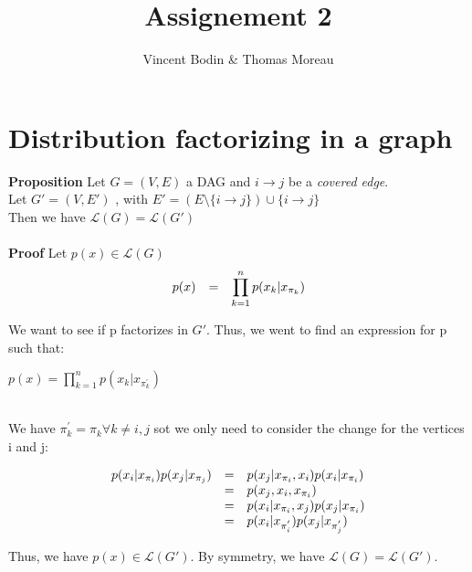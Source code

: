 \documentclass[11pt]{article}
\title{\textbf{Assignement 2}}
\author{Vincent Bodin \& Thomas Moreau}
\date{}
\begin{document}
\maketitle

\section{Distribution factorizing in a graph}

\textbf{Proposition} Let $G = (V, E)$ a DAG and $i \rightarrow j$ be a \textit{covered edge}.\\
Let  $G' = (V, E')$ , with $E' = (E\setminus\{i\rightarrow j\})\cup \{i \rightarrow j\}$\\
Then we have $\mathcal{L}(G) = \mathcal{L}(G')$\\
\\
\textbf{Proof}  Let $p(x) \in \mathcal{L}(G)$\\
\begin{equation*}
\begin{array}{r l l}
p(x) &=& \displaystyle\prod_{k=1}^{n} p(x_k | x_{\pi_k})\\
\end{array}
\end{equation*}

We want to see if p factorizes in $G'$. Thus, we went to find an expression for p such that:\\
\centerline{$p(x) = \displaystyle\prod_{k=1}^{n} p(x_k | x_{\pi_k^{'}})$}
\\
We have $\pi_k^{'} = \pi_k \forall k \neq i,j$ sot we only need to consider the change for the vertices i and j:


\begin{equation*}
\begin{array}{r l l}
p(x_i| x_{\pi_i}) p(x_j | x_{\pi_j}) &=& p(x_j | x_{\pi_i}, x_i) p(x_i | x_{\pi_i})\\
&=& p(x_j, x_i, x_{\pi_i})\\
&=& p(x_i | x_{\pi_i}, x_j) p(x_j | x_{\pi_i})\\
&=& p(x_i| x_{\pi_i^{'}}) p(x_j | x_{\pi_j^{'}})\\
\end{array}
\end{equation*}

Thus, we have $p(x) \in \mathcal{L}(G')$. By symmetry, we have $\mathcal{L}(G) = \mathcal{L}(G')$.
\end{document}

